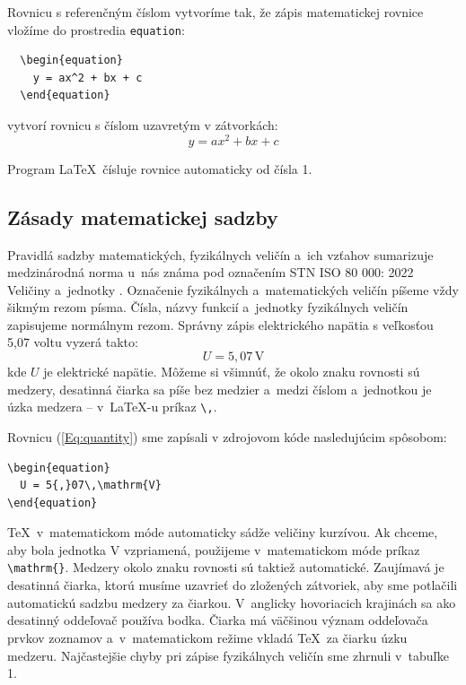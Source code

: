 Rovnicu s referenčným číslom vytvoríme tak, že zápis matematickej
rovnice vložíme do prostredia \verb|equation|:
\begin{verbatim}
  \begin{equation}
    y = ax^2 + bx + c
  \end{equation}
\end{verbatim}
vytvorí rovnicu s číslom uzavretým v zátvorkách:
\begin{equation}
  y = ax^2 + bx + c
\end{equation}

Program \LaTeX\ čísluje rovnice automaticky od čísla 1.

\subsection{Zásady matematickej sadzby}
Pravidlá sadzby matematických, fyzikálnych veličín a~ich vzťahov
sumarizuje medzinárodná norma u~nás známa pod označením
STN ISO 80 000: 2022 Veličiny a~jednotky \cite{iso800001, iso800002}.
Označenie fyzikálnych a~matematických veličín píšeme vždy
šikmým rezom písma.
Čísla, názvy funkcií a~jednotky fyzikálnych veličín zapisujeme
normálnym rezom.
Správny zápis elektrického napätia s veľkosťou 5,07 voltu
vyzerá takto:
\begin{equation}\label{Eq:quantity}
  U = 5{,}07\,\mathrm{V}
\end{equation}
kde $U$ je elektrické napätie.
Môžeme si všimnúť, že okolo znaku rovnosti sú medzery,
desatinná čiarka sa píše bez medzier a~medzi číslom a~jednotkou
je úzka medzera -- v~\LaTeX-u príkaz \verb|\,|.

Rovnicu (\ref{Eq:quantity}) sme zapísali v zdrojovom kóde nasledujúcim spôsobom:
\begin{verbatim}
\begin{equation}
  U = 5{,}07\,\mathrm{V}
\end{equation}
\end{verbatim}
\TeX\ v~matematickom móde automaticky sádže veličiny kurzívou.
Ak chceme, aby bola jednotka V vzpriamená, použijeme
v~matematickom móde príkaz \verb|\mathrm{}|. Medzery okolo znaku rovnosti sú taktiež automatické.
Zaujímavá je desatinná čiarka, ktorú musíme uzavrieť do
zložených zátvoriek, aby sme potlačili automatickú sadzbu
medzery za čiarkou.
V~anglicky hovoriacich krajinách sa ako desatinný oddeľovač
používa bodka.
Čiarka má väčšinou význam oddeľovača prvkov zoznamov
a~v~matematickom režime vkladá \TeX\, za čiarku úzku medzeru.
Najčastejšie chyby pri zápise fyzikálnych veličín sme zhrnuli
v~tabuľke 1.

